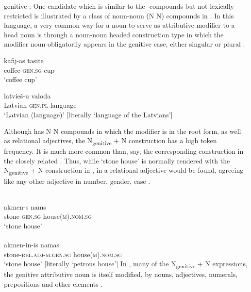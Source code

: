 \documentclass[output=paper,colorlinks,citecolor=brown]{langscibook}
\begin{document}
 genitive :
One candidate which is similar to the -compounds but not lexically restricted is illustrated by a class of noun-noun (N N) compounds in .  In this language, a very common way for a noun to serve as attributive modifier to a head noun is through a noun-noun headed  construction type in which the modifier noun obligatorily appears in the genitive case, either singular  or plural  \citep[56]{mathiassen1997}.

\ea
\ea \label{kafijas}
\gll	kafij-as 			tas\={\i}te				\\
coffee-\textsc{gen.sg} 	cup				\\ 
\glt		`coffee cup'  

\ex\label{latviesu}
\gll	latvie\v{s}-u			valoda				\\
Latvian-\textsc{gen.pl} 	language				\\ 
\glt		`Latvian (language)' [literally `language of the Latvians']
\z
\z

Although  has N N compounds in which the modifier is in the root form, as well as relational adjectives, the  N\textsubscript{genitive} + N construction has a high token frequency. It is much more common than, say, the corresponding construction in the closely related .  Thus, while `stone house' is normally rendered with the N\textsubscript{genitive} + N construction in , in  a relational adjective would be found, agreeing like any other adjective in number, gender, case  \citep[174]{kalnacalokmane2016}.

\ea
\ea\label{akmens}  \\
\gll	akmen-s			nams			\\
stone\textsc{-gen.sg}	house(\textsc{m}).\textsc{nom.sg}	\\
\glt		`stone house'\\

\ex\label{akmeninin}  \\
\gll	akmen-in-is				namas			\\
stone\textsc{-rel.adj-m.gen.sg}	house(\textsc{m}).\textsc{nom.sg}		\\
\glt		`stone house' [literally `petrous house']
\z
\z
In , many of the N\textsubscript{genitive} + N expressions, the genitive attributive noun is itself modified, by nouns, adjectives, numerals, prepositions and other elements \citep[171]{kalnacalokmane2016}.
\end{document}
